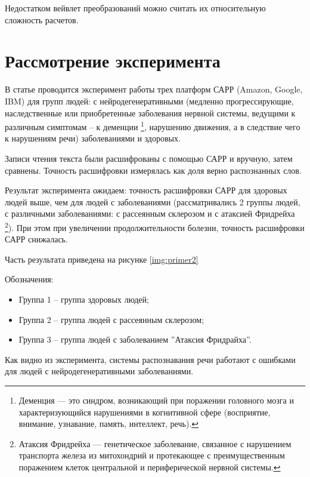 Недостатком вейвлет преобразований можно считать их относительную сложность расчетов. 


\section{Рассмотрение эксперимента} \label{5000}
В статье \cite{primer} проводится эксперимент работы трех платформ САРР (Amazon, Google, IBM) для групп людей: с нейродегенеративными (медленно прогрессирующие, наследственные или приобретенные заболевания нервной системы, ведущими к различным симптомам -- к деменции \footnote{Деменция — это синдром, возникающий при поражении головного мозга и характеризующийся нарушениями в когнитивной сфере (восприятие, внимание, узнавание, память, интеллект, речь).}, нарушению движения, а в следствие чего к нарушениям речи) заболеваниями и здоровых.

Записи чтения текста были расшифрованы с помощью САРР и вручную, затем сравнены. Точность расшифровки измерялась как доля верно распознанных слов. 

Результат эксперимента ожидаем: точность расшифровки САРР для здоровых людей выше, чем для людей с заболеваниями (рассматривались 2 группы людей, с различными заболеваниями: с рассеянным склерозом и с атаксией Фридрейха \footnote{Атаксия Фридрейха — генетическое заболевание, связанное с нарушением транспорта железа из митохондрий и протекающее с преимущественным поражением клеток центральной и периферической нервной системы.}). При этом при увеличении продолжительности болезни, точность расшифровки САРР снижалась. 

Часть результата приведена на рисунке \ref{img:primer2}

Обозначения: 
\begin{itemize}
	\item Группа 1 -- группа здоровых людей;
	\item Группа 2 -- группа людей с рассеянным склерозом;
	\item Группа 3 -- группа людей с заболеванием ''Атаксия Фридрайха''.
\end{itemize}

Как видно из эксперимента, системы распознавания речи работают с ошибками для людей с нейродегенеративными заболеваниями.
